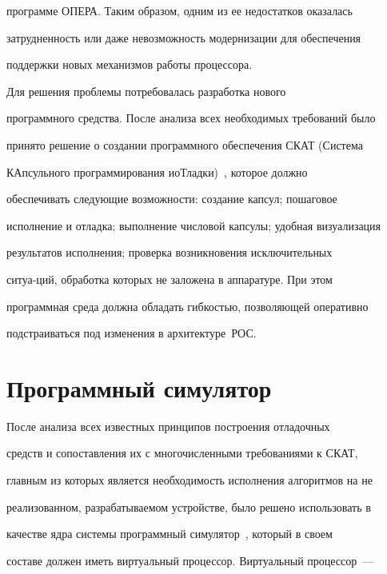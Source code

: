 программе ОПЕРА. Таким образом, одним из ее недостатков оказалась 


затрудненность или даже невозможность модернизации для обеспечения 


поддержки новых механизмов работы процессора. 


      


      Для решения проблемы потребовалась разработка нового\linebreak 


программного средства. После анализа всех необходимых требований было 


принято решение о создании программного обес\-печения СКАТ (Система 


КАпсульного программирования и\linebreak оТладки)~\cite{4-2}, которое должно 


обеспечивать следующие возможности: создание капсул; пошаговое 


исполнение и отладка; выполнение числовой капсулы; удобная визуализация 


результатов исполнения; проверка возникновения исключительных 


ситуа-\linebreak ций, обработка которых не заложена в аппаратуре. При этом 


программная среда должна обладать гибкостью, позволяющей оперативно 


подстраиваться под изменения в архитектуре~РОС.





\section{Программный симулятор}





      После анализа всех известных принципов построения отладочных 


средств и сопоставления их с многочисленными требованиями к СКАТ, 


главным из которых является необходимость исполнения алгоритмов на не 


реализованном, разрабатываемом устройстве, было решено использовать в 


качестве ядра системы программный симулятор~\cite{5-2}, который в своем 


составе должен иметь виртуальный процессор. Виртуальный процессор~--- 


